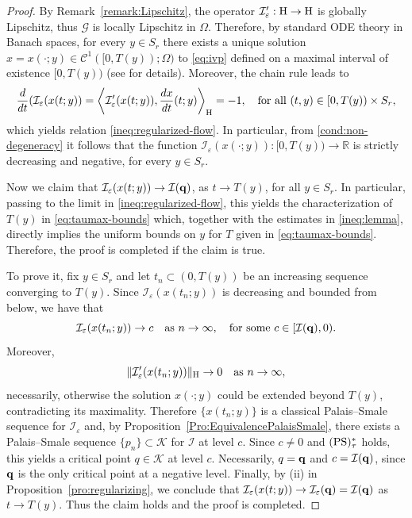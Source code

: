 \documentclass{article}
\newcommand{\boC}{\mathcal{C}}
\newcommand{\boK}{\mathcal{K}}
\newcommand{\boI}{\mathcal{I}}
\newcommand{\R}{\mathbb{R}}
\newcommand{\boG}{\mathcal{G}}
\newcommand{\Hilb}{{\textnormal H}}
\newcommand{\minq}{{\bf q}}
\newcommand{\PS}{(\textnormal{PS})^{*}_\tau}
\newcommand{\taumax}{T}
\theoremstyle{definition}
\begin{document}
\begin{proof}
By Remark~\ref{remark:Lipschitz}, the operator $\boI'_\varepsilon:\Hilb\to\Hilb$ is globally Lipschitz, thus ${\boG}$ is locally Lipschitz in $\Omega$. Therefore, by standard ODE theory in Banach spaces, for every $y\in S_r$ there exists a unique solution $x=x(\cdot;y)\in\boC^1([0,\taumax(y));\Omega)$ to \eqref{eq:ivp} defined on a maximal interval of existence $[0,\taumax(y))$ (see \cite{Deim} for details). Moreover, the chain rule leads to
\begin{equation}\label{eq:derivative-1}
	\frac{d}{dt}(\boI_\varepsilon(x(t;y))=\left\langle \boI_\varepsilon'(x(t;y)),\frac{dx}{dt}(t;y)\right\rangle_\Hilb=-1,\quad\hbox{for all } (t,y)\in[0,\taumax(y))\times S_r,
\end{equation}
which yields relation \eqref{ineq:regularized-flow}. In particular, from \eqref{cond:non-degeneracy} it follows that the function $\boI_\varepsilon(x(\cdot;y)):[0,\taumax(y))\to\R$ is strictly decreasing and negative, for every $y\in S_r$.

Now we claim that  $\boI_\varepsilon(x(t;y))\to\boI(\minq)$, as $t\to\taumax(y)$, for all $y\in S_r$. In particular, passing to the limit in \eqref{ineq:regularized-flow}, this yields the characterization of $\taumax(y)$ in \eqref{eq:taumax-bounds} which, together with the estimates in \eqref{ineq:lemma}, directly implies the uniform bounds on $y$ for $\taumax$ given in \eqref{eq:taumax-bounds}. Therefore, the proof is completed if the claim is true. 

To prove it, fix $y\in S_r$ and let ${t_n}\subset(0,\taumax(y))$ be an increasing sequence converging to $\taumax(y)$. Since ${\boI_\varepsilon(x(t_n;y))}$ is decreasing and bounded from below, we have that
\[
\boI_\varepsilon(x(t_n;y))\to c\quad\text{as }n\to\infty,\quad\text{for some }c\in[\boI(\minq),0).
\]
Moreover, 
\[
\|\boI_\varepsilon'(x(t_n;y))\|_\Hilb\to 0\quad\text{as }n\to\infty,
\]
necessarily, otherwise the solution $x(\cdot;y)$ could be extended beyond $\taumax(y)$, contradicting its maximality. Therefore $\{x(t_n;y)\}$ is a classical Palais--Smale sequence for $\boI_\varepsilon$ and, by Proposition~\ref{Pro:EquivalencePalaisSmale}, there exists a Palais--Smale sequence $\{p_n\}\subset\boK$ for $\boI$ at level $c$. Since $c\neq0$ and $\PS$ holds, this yields a critical point $q\in\boK$ at level $c$. Necessarily, $q=\minq$ and $c=\boI(\minq)$, since $\minq$ is the only critical point at a negative level. Finally, by (ii) in Proposition~\ref{pro:regularizing}, we conclude that $\boI_\varepsilon(x(t;y))\to \boI_\varepsilon(\minq)=\boI(\minq)$ as $t\to\taumax(y)$. Thus the claim holds and the proof is completed.
\end{proof}
\end{document}
